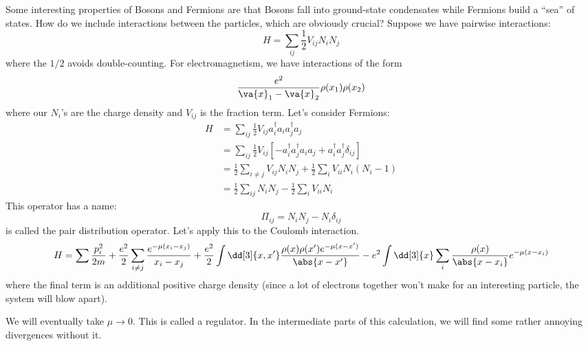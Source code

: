 \documentclass[a4paper,twoside,master.tex]{subfiles}
\begin{document}
Some interesting properties of Bosons and Fermions are that Bosons fall into ground-state condensates while Fermions build a ``sea'' of states. How do we include interactions between the particles, which are obviously crucial? Suppose we have pairwise interactions:
\begin{equation}
    H = \sum_{ij} \frac{1}{2} V_{ij} N_i N_j
\end{equation}
where the $ 1/2 $ avoids double-counting. For electromagnetism, we have interactions of the form
\begin{equation}
    \frac{e^2}{\va{x}_1 - \va{x}_2} \rho(x_1) \rho(x_2) 
\end{equation}
where our $ N_i $'s are the charge density and $ V_{ij} $ is the fraction term. Let's consider Fermions:
\begin{align}
    H &= \sum_{ij} \frac{1}{2} V_{ij} a^\dagger_i a_i a^\dagger_j a_j \\
    &= \sum_{ij} \frac{1}{2} V_{ij} \left[ -a_i^\dagger a_j^\dagger a_i a_j + a_i^\dagger a_j^\dagger \delta_{ij} \right] \\
    &= \frac{1}{2} \sum_{i\neq j} V_{ij} N_i N_j + \frac{1}{2} \sum_i V_{ii} N_i (N_i - 1) \\
    &= \frac{1}{2} \sum_{ij} N_i N_j - \frac{1}{2} \sum_i V_{ii} N_i
\end{align}
This operator has a name:
\begin{equation}
    \Pi_{ij} = N_i N_j - N_i \delta_{ij}
\end{equation}
is called the pair distribution operator. Let's apply this to the Coulomb interaction.
\begin{equation}
    H = \sum \frac{p_i^2}{2m} + \frac{e^2}{2} \sum_{i \neq j} \frac{e^{- \mu (x_i - x_j)}}{x_i - x_j} + \frac{e^2}{2} \int \dd[3]{x,x'} \frac{\rho(x) \rho(x') e^{- \mu(x - x')}}{\abs{x - x'}} - e^2 \int \dd[3]{x} \sum_i \frac{\rho(x)}{\abs{x - x_i}} e^{- \mu(x - x_i)}
\end{equation}
where the final term is an additional positive charge density (since a lot of electrons together won't make for an interesting particle, the system will blow apart).


We will eventually take $ \mu \to 0 $. This is called a regulator. In the intermediate parts of this calculation, we will find some rather annoying divergences without it.
\end{document}
